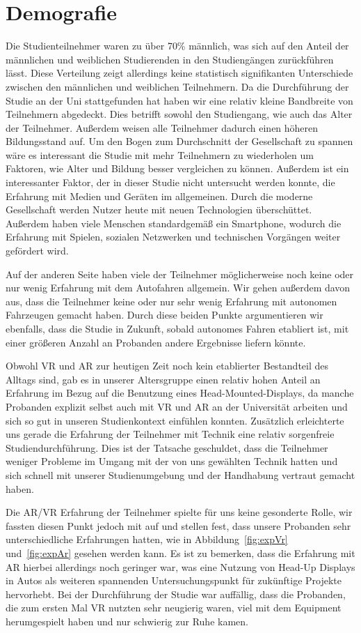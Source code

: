 \section{Demografie}

Die Studienteilnehmer waren zu über 70\% männlich, was sich auf den Anteil der männlichen und weiblichen Studierenden in den Studiengängen zurückführen lässt. Diese Verteilung zeigt allerdings keine statistisch signifikanten Unterschiede zwischen den männlichen und weiblichen Teilnehmern.
Da die Durchführung der Studie an der Uni stattgefunden hat haben wir eine relativ kleine Bandbreite von Teilnehmern abgedeckt. Dies betrifft sowohl den Studiengang, wie auch das Alter der Teilnehmer. Außerdem weisen alle Teilnehmer dadurch einen höheren Bildungsstand auf. 
Um den Bogen zum Durchschnitt der Gesellschaft zu spannen wäre es interessant die Studie mit mehr Teilnehmern zu wiederholen um Faktoren, wie Alter und Bildung besser vergleichen zu können.
Außerdem ist ein interessanter Faktor, der in dieser Studie nicht untersucht werden konnte, die Erfahrung mit Medien und Geräten im allgemeinen. 
Durch die moderne Gesellschaft werden Nutzer heute mit neuen Technologien überschüttet. Außerdem haben viele Menschen standardgemäß ein Smartphone, wodurch die Erfahrung mit Spielen, sozialen Netzwerken und technischen Vorgängen weiter gefördert wird.

Auf der anderen Seite haben viele der Teilnehmer möglicherweise noch keine oder nur wenig Erfahrung mit dem Autofahren allgemein. Wir gehen außerdem davon aus, dass die Teilnehmer keine oder nur sehr wenig Erfahrung mit autonomen Fahrzeugen gemacht haben. Durch diese beiden Punkte argumentieren wir ebenfalls, dass die Studie in Zukunft, sobald autonomes Fahren etabliert ist, mit einer größeren Anzahl an Probanden andere Ergebnisse liefern könnte. 

Obwohl VR und AR zur heutigen Zeit noch kein etablierter Bestandteil des Alltags sind, gab es in unserer Altersgruppe einen relativ hohen Anteil an Erfahrung im Bezug auf die Benutzung eines Head-Mounted-Displays, da manche Probanden explizit selbst auch mit VR und AR an der Universität arbeiten und sich so gut in unseren Studienkontext einfühlen konnten.
Zusätzlich erleichterte uns gerade die Erfahrung der Teilnehmer mit Technik eine relativ sorgenfreie Studiendurchführung. Dies ist der Tatsache geschuldet, dass die Teilnehmer weniger Probleme im Umgang mit der von uns gewählten Technik hatten und sich schnell mit unserer Studienumgebung und der Handhabung vertraut gemacht haben.

Die AR/VR Erfahrung der Teilnehmer spielte für uns keine gesonderte Rolle, wir fassten diesen Punkt jedoch mit auf und stellen fest, dass unsere Probanden sehr unterschiedliche Erfahrungen hatten, wie in Abbildung~\ref{fig:expVr} und~\ref{fig:expAr} gesehen werden kann. Es ist zu bemerken, dass die Erfahrung mit AR hierbei allerdings noch geringer war, was eine Nutzung von Head-Up Displays in Autos als weiteren spannenden Untersuchungspunkt für zukünftige Projekte hervorhebt. 
Bei der Durchführung der Studie war auffällig, dass die Probanden, die zum ersten Mal VR nutzten sehr neugierig waren, viel mit dem Equipment herumgespielt haben und nur schwierig zur Ruhe kamen.